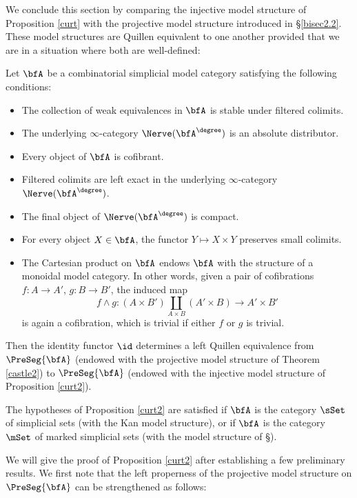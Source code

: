 We conclude this section by comparing the injective model structure of
Proposition \ref{curt} with the projective model structure introduced in
\S \ref{bisec2.2}. These model structures are Quillen equivalent to one another
provided that we are in a situation where both are well-defined:

\begin{proposition}\label{curt2}
Let $\bfA$ be a combinatorial simplicial model category satisfying the following conditions:
\begin{itemize}
\item[$(a)$] The collection of weak equivalences in $\bfA$ is stable under filtered colimits.
\item[$(b)$] The underlying $\infty$-category $\Nerve( \bfA^{\degree})$ is an absolute distributor.
\item[$(c)$] Every object of $\bfA$ is cofibrant.
\item[$(d)$] Filtered colimits are left exact in the underlying $\infty$-category
$\Nerve( \bfA^{\degree})$.
\item[$(e)$] The final object of $\Nerve( \bfA^{\degree})$ is compact.
\item[$(f)$] For every object $X \in \bfA$, the functor $Y \mapsto X \times Y$ preserves small colimits.
\item[$(g)$] The Cartesian product on $\bfA$ endows $\bfA$ with the structure of a monoidal model category. In other words, given a pair of cofibrations $f: A \rightarrow A'$, $g: B \rightarrow B'$, the induced map
$$ f \wedge g: (A \times B') \coprod_{ A \times B} (A' \times B) \rightarrow A' \times B'$$
is again a cofibration, which is trivial if either $f$ or $g$ is trivial.
\end{itemize}
Then the identity functor $\id$ determines a left Quillen equivalence
from $\PreSeg{ \bfA}$ (endowed with the projective model structure of Theorem \ref{castle2})
to $\PreSeg{\bfA}$ (endowed with the injective model structure of Proposition \ref{curt2}).
\end{proposition}

\begin{remark}
The hypotheses of Proposition \ref{curt2} are satisfied if
$\bfA$ is the category $\sSet$ of simplicial sets (with the Kan model structure), or if
$\bfA$ is the category $\mSet$ of marked simplicial sets (with the model structure of
\S {}).
\end{remark}

We will give the proof of Proposition \ref{curt2} after establishing a few preliminary results.
We first note that the left properness of the projective model structure on $\PreSeg{\bfA}$
can be strengthened as follows:

